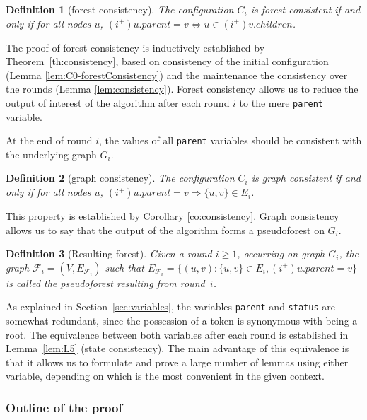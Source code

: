 \documentclass[twocolumn]{article}
\newtheorem{definition}{Definition}
\newcommand{\state}[3]{\ensuremath{(#2^{#3})#1}}
\newcommand{\uip}{\state{u}{i}{+}}
\newcommand{\vip}{\state{v}{i}{+}}
\begin{document}
\begin{definition}[forest consistency]
The configuration $C_i$
is forest consistent if and only if for all nodes $u$,
$\uip.parent = v \Leftrightarrow u \in \vip.children$.
\end{definition}

The proof of forest consistency is inductively established by Theorem~\ref{th:consistency}, based on consistency of the initial configuration (Lemma \ref{lem:C0-forestConsistency}) and the maintenance the consistency over the rounds (Lemma \ref{lem:consistency}).
Forest consistency allows us to reduce the output of interest of the algorithm after each round $i$ to the mere \texttt{parent} variable. 

At the end of round $i$, the values of all \texttt{parent} variables should be consistent with the underlying graph $G_i$.


\begin{definition}[graph consistency]
The configuration $C_i$
is graph consistent if and only if for all nodes $u$,
$\uip.parent = v \Rightarrow \{u,v\} \in E_i$.
\end{definition}

This property is established by Corollary \ref{co:consistency}.
Graph consistency allows us to say that the output of the algorithm forms a pseudoforest on $G_i$.

 
\begin{definition}[Resulting forest]
  \label{def:F_i}
  Given a round $i\ge 1$, occurring on graph $G_i$, the graph $\mathcal{F}_i=(V,E_{\mathcal{F}_i})$ such that $E_{\mathcal{F}_i}=\{(u,v) : \{u,v\} \in E_i, \uip.parent=v\}$ is called the {\em pseudoforest} resulting from round~$i$. 
\end{definition}

\FloatBarrier

As explained in Section~\ref{sec:variables}, the variables {\tt parent} and {\tt status} are somewhat redundant, since the possession of a token is synonymous with being a root. The equivalence between both variables after each round is established in Lemma~\ref{lem:L5} (state consistency). The main advantage of this equivalence is that it allows us to formulate and prove a large number of lemmas using either variable, depending on which is the most convenient in the given context.

\subsubsection{Outline of the proof}
\end{document}
